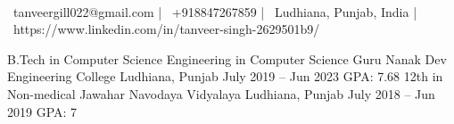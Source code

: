 \documentclass[]{awesome-cv}
\begin{document}
    
\begin{center}
	  \\
	\vspace{2mm}
	{\faEnvelope\ tanveergill022@gmail.com} | {\faMobile\ +918847267859} | {\faMapMarker\ Ludhiana, Punjab, India} | {\faLink\ https://www.linkedin.com/in/tanveer-singh-2629501b9/}
\end{center}
\begin{cventries}
	\cventry
	{B.Tech in Computer Science Engineering in Computer Science}
	{Guru Nanak Dev Engineering College}
	{Ludhiana, Punjab}
	{July 2019 – Jun 2023}
	{GPA: 7.68}
	\cventry
	{12th in Non-medical}
	{Jawahar Navodaya Vidyalaya}
	{Ludhiana, Punjab}
	{July 2018 – Jun 2019}
	{GPA: 7}
\end{cventries}
\end{document}
